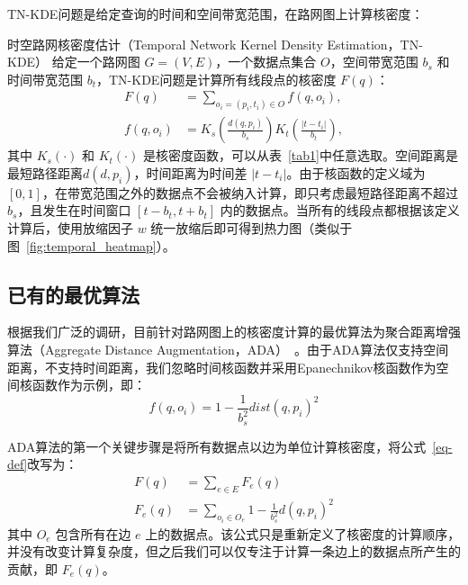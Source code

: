 TN-KDE问题是给定查询的时间和空间带宽范围，在路网图上计算核密度：
\begin{definition}{时空路网核密度估计（Temporal Network Kernel Density Estimation，TN-KDE）}
	给定一个路网图 $G=(V, E)$，一个数据点集合 $O$，空间带宽范围 $b_s$ 和时间带宽范围 $b_t$，TN-KDE问题是计算所有线段点的核密度 $F(q)$：
\begin{equation}
\label{eq-def}
\begin{aligned}
	F(q) &= \sum_{o_i=(p_i, t_i) \in O} f(q, o_i), \\
	f(q, o_i) &= 
	K_s\left(\frac{d(q, p_i)}{b_s}\right)
	K_t\left(\frac{\vert t - t_i \vert}{b_t}\right),
\end{aligned}
\end{equation}
其中 $K_s(\cdot)$ 和 $K_t(\cdot)$ 是核密度函数，可以从表~\ref{tab1}中任意选取。空间距离是最短路径距离$d(d, p_i)$，时间距离为时间差 $\vert t - t_i \vert$。由于核函数的定义域为 $[0,1]$，在带宽范围之外的数据点不会被纳入计算，即只考虑最短路径距离不超过 $b_s$，且发生在时间窗口 $[t - b_t, t + b_t]$ 内的数据点。当所有的线段点都根据该定义计算后，使用放缩因子 $w$ 统一放缩后即可得到热力图（类似于图~\ref{fig:temporal_heatmap}）。
\end{definition}





\subsection{已有的最优算法}
\label{sec:sota}

根据我们广泛的调研，目前针对路网图上的核密度计算的最优算法为聚合距离增强算法（Aggregate Distance Augmentation，ADA）~\cite{chan_fast_2021}。由于ADA算法仅支持空间距离，不支持时间距离，我们忽略时间核函数并采用Epanechnikov核函数作为空间核函数作为示例，即：
\begin{equation*}
	f(q, o_i) = 1 - \frac{1}{b_s^2} dist(q, p_i)^2
\end{equation*}

ADA算法的第一个关键步骤是将所有数据点以边为单位计算核密度，将公式~\ref{eq-def}改写为：
\begin{equation*}
\label{eq-transform}
\begin{aligned}
	F(q) &= \sum_{e \in E} F_e(q) \\
	F_e(q) &= \sum_{o_i \in O_e} 1 - \frac{1}{b_s^2} d(q, p_i)^2
\end{aligned}
\end{equation*}
其中 $O_e$ 包含所有在边 $e$ 上的数据点。该公式只是重新定义了核密度的计算顺序，并没有改变计算复杂度，但之后我们可以仅专注于计算一条边上的数据点所产生的贡献，即 $F_e(q)$。

